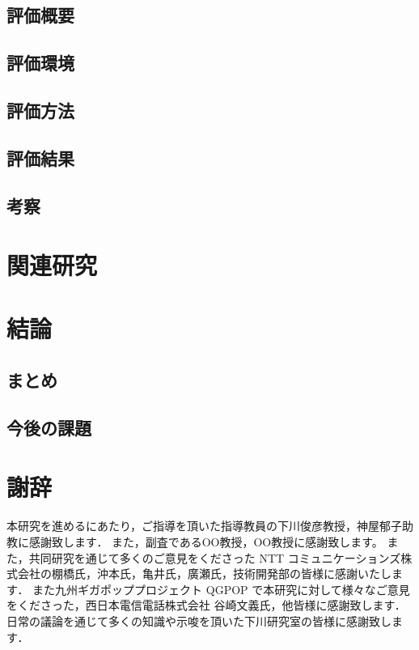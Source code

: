 \documentclass[a4j,12pt,onecolumn,oneside,titlepage,openany,final]{jreport}
\begin{document}
\section{評価概要}
\section{評価環境}
\section{評価方法}
\section{評価結果}
\section{考察}

\chapter{関連研究}\label{chap:Related_Research}
\section{}

\chapter{結論}\label{chap:Conclusion}
\section{まとめ}
\section{今後の課題}

\chapter*{謝辞}
本研究を進めるにあたり，ご指導を頂いた指導教員の下川俊彦教授，神屋郁子助教に感謝致します．
また，副査であるOO教授，OO教授に感謝致します。
また，共同研究を通じて多くのご意見をくださった NTT コミュニケーションズ株式会社の棚橋氏，沖本氏，亀井氏，廣瀬氏，技術開発部の皆様に感謝いたします．
また九州ギガポッププロジェクト QGPOP で本研究に対して様々なご意見をくださった，西日本電信電話株式会社 谷崎文義氏，他皆様に感謝致します．
日常の議論を通じて多くの知識や示唆を頂いた下川研究室の皆様に感謝致します．
\end{document}

